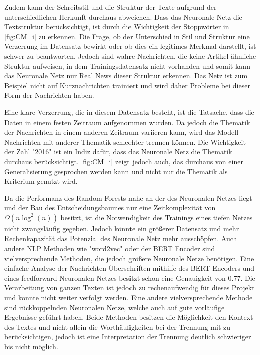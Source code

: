 Zudem kann der Schreibstil und die Struktur der Texte aufgrund der unterschiedlichen Herkunft 
durchaus abweichen.
Dass das Neuronale Netz die Textstruktur berücksichtigt, ist durch die Wichtigkeit der Stoppwörter in \autoref{fig:CM_i}
zu erkennen.
Die Frage, ob der Unterschied in Stil und Struktur eine Verzerrung im Datensatz bewirkt oder ob dies ein 
legitimes Merkmal darstellt, ist schwer zu beantworten.
Jedoch sind wahre Nachrichten, die keine Artikel ähnliche Struktur aufweisen, in dem Trainingsdatensatz nicht 
vorhanden und somit kann das Neuronale Netz nur Real News dieser Struktur erkennen.
Das Netz ist zum Beispiel nicht auf Kurznachrichten trainiert und wird daher Probleme bei dieser Form der Nachrichten 
haben.


Eine klare Verzerrung, die in diesem Datensatz besteht, ist die Tatsache, dass die Daten in einem festen 
Zeitraum aufgenommen wurden.
Da jedoch die Thematik der Nachrichten in einem anderen Zeitraum variieren kann, wird das 
Modell Nachrichten mit anderer Thematik schlechter trennen können.
Die Wichtigkeit der Zahl "2016" ist ein Indiz dafür, dass das Neuronale Netz die Thematik durchaus berücksichtigt.
\autoref{fig:CM_i} zeigt jedoch auch, das durchaus von einer Generalisierung gesprochen werden kann und nicht nur 
die Thematik als Kriterium genutzt wird.

Da die Performanz des Random Forests nahe an der des Neuronalen Netzes liegt und der Bau des Entscheidungsbaumes 
nur eine Zeitkomplexität von $\Omega(n \log^2 (n))$\cite[96]{understanding_RF} besitzt, ist die Notwendigkeit des 
Trainings eines tiefen Netzes nicht zwangsläufig gegeben.
Jedoch könnte ein größerer Datensatz und mehr Rechenkapazität das Potenzial des Neuronale Netz mehr ausschöpfen.
Auch andere NLP Methoden wie "word2vec" oder der BERT Encoder\cite{bert} sind vielversprechende Methoden, die jedoch 
größere Neuronale Netze benötigen. 
Eine einfache Analyse der Nachrichten Überschriften mithilfe des BERT Encoders und eines feedforward Neuronalen 
Netzes besitzt schon eine Genauigkeit von $0.77$. 
Die Verarbeitung von ganzen Texten ist jedoch zu rechenaufwendig für dieses Projekt und konnte nicht weiter 
verfolgt werden.
Eine andere vielversprechende Methode sind rückkoppelnden Neuronalen Netze, welche auch auf gute vorläufige Ergebnisse 
geführt haben.
Beide Methoden besitzen die Möglichkeit den Kontext des Textes und nicht allein die Worthäufigkeiten bei der 
Trennung mit zu berücksichtigen, jedoch ist eine Interpretation der Trennung deutlich schwieriger bis nicht möglich.

